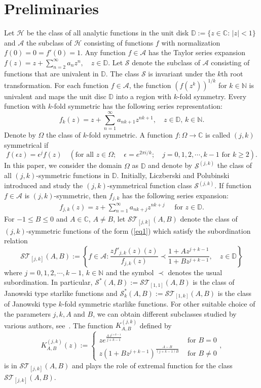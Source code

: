 \documentclass[12pt]{amsart}
\numberwithin{equation}{section}
\theoremstyle{definition}
\numberwithin{equation}{section}
\newcommand{\beq}{\begin{eqnarray}}
\newcommand{\eeq}{\end{eqnarray}}
\newcommand{\A}{{\mathcal A}}
\newcommand{\T}{{\mathcal T}}
\newcommand{\es}{{\mathcal S}}
\newcommand{\IC}{{\mathbb C}}
\newcommand{\D}{{\mathbb D}}
\newcommand{\N}{{\mathbb N}}
\begin{document}
\thispagestyle{empty}

\section{Preliminaries} %
Let $\mathcal{H}$ be the class of all analytic functions in the unit disk $\D:=\{z\in\mathbb{C}:\, |z|<1 \}$
and  $\A$ the subclass of $\mathcal{H}$ consisting of functions $f$ with normalization $f(0)=0=f'(0)=1$. Any function $f\in\A$ has the Taylor series expansion 
$ f(z)=z+\sum_{n=2}^\infty a_n z^n,\quad z\in\D. $
Let $\es$ denote the subclass of $\A$ consisting of functions that are univalent in $\D$.
The class $\es$ is invariant under the $k$th root transformation. 
For each function $f\in \A$, the function $(f(z^k))^{1/k}$ for $k\in \mathbb{N}$ is univalent and maps the unit disc $\D$ into a region with $k$-fold symmetry. Every function with $k$-fold symmetric has the following series representation:
$$ f_k(z)=z+\sum_{n=1}^\infty a_{nk+1} z^{nk+1},\quad z\in\D,\,k\in \mathbb{N}. 
$$
Denote by $\Omega$ the class of $k$-fold symmetric. A function $f:\Omega \rightarrow \mathbb{C}$ is called $(j,k)$ symmetrical if
$$ f(\epsilon z) =\epsilon ^j f(z) \quad \left(\mbox{for all } z\in\Omega; \quad \epsilon =e^{2\pi i /k}; \quad j=0,1,2,\cdots,k-1 \mbox{ for } k\ge 2 \right).
$$
In this paper, we consider the domain $\Omega$ as $\D$ and denote by $\es ^{(j,k)}$ the class of all ${(j,k)}$-symmetric functions in $\D$. 
Initially, Liczberski and Polubinski introduced and study the ${(j,k)}$-symmetrical function class $\es ^{(j,k)}$. 
If function $f\in \mathcal{A}$ is $(j,k)$-symmetric, then $f_{j,k}$ has the following series expansion:
\beq\label{eq1}
f_{j,k}(z)=z+\sum_{n=1}^\infty a_{nk+j} z^{nk+j} \quad \mbox{ for } z\in\D. 
\eeq
For $-1\leq B\leq 0$ and $A\in  \IC$, $A\neq B$, let $\es \T_{[j,k]}(A,B)$ denote the class of ${(j,k)}$-symmetric functions of the form (\ref{eq1})
which satisfy the subordination relation
$$\es \T_{[j,k]}(A,B):=\left \{f\in \A: \frac{zf'_{j,k}(z)(z)}{f_{j,k}(z)}\prec \frac{1+Az^{j+k-1}}{1+Bz^{j+k-1}},
\quad   z\in \D   \right\}
$$
where $j=0,1,2,\cdots,k-1,\, k\in \N$ and the symbol $\prec$ denotes the usual subordination.
In particular, $\es^*(A,B):=\es \T_{[1,1]}(A,B)$ is the class of Janowski type starlike functions and 
$\es^*_{k}(A,B):=\es \T_{[1,k]}(A,B)$ is the class of Janowski type $k$-fold symmetric starlike functions.
For other suitable choice of the parameters $j,k,A$ and $B$, we can obtain different subclasses studied by various authors, see~\cite{HG22}.
The function $K^{(j,k)}_{A,B}$ defined by
\begin{equation}\label{eq2}
\displaystyle K^{(j,k)}_{A,B}(z):=
\left \{
\begin{array}{ll}
ze^{\frac{A\,z^{j+k-1}}{j+k-1}} & \mbox{ for } B=0\\
z(1+Bz^{j+k-1})^{\frac{A-B}{(j+k-1)B}} & \mbox{ for } B\neq 0
     \end{array}, \right.
\end{equation}
is in $\es \T_{[j,k]}(A,B)$ and plays the role of extremal function for the class $\es \T_{[j,k]}(A,B)$. 
\end{document}
